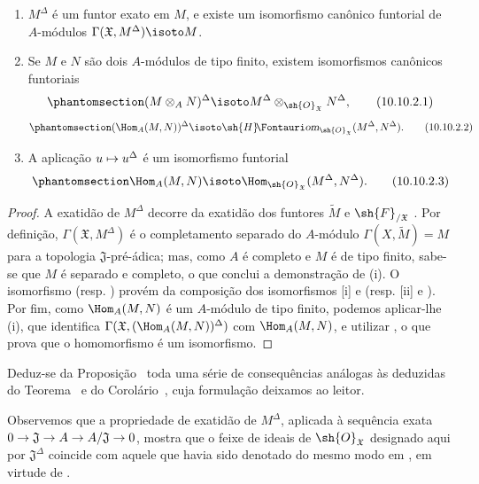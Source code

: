 \documentclass[oneside]{amsart}
\makeatletter
\newcommand{\ega@arrow}[2]{\mathchoice{#1}{#2}{#2}{#2}}
\let\ega@shortmapsto\mapsto
\renewcommand{\to}{\ega@arrow{\longrightarrow}{\rightarrow}}
\renewcommand{\mapsto}{\ega@arrow{\longmapsto}{\ega@shortmapsto}}
\newcommand*{\ega@sheafop}[3]{\sh{#1}#2\textup{\kern-2.2pt{\Fontauri\slshape #3}}}
\newcommand*{\shHom}{\ega@sheafop{H}{}{om}}
\newcommand{\oldpage}[2][]{{\marginnote{\normalfont\textbf{#1}~|~#2}}\ignorespaces}
\let\EGAOriginalLabel\label
\renewcommand{\label}[1]{\phantomsection\EGAOriginalLabel{#1}}
\makeatother
\begin{document}
\begin{proposition}[10.10.2]
\label{I.10.10.2}
\medskip\noindent
\begin{enumerate}
  \item[\rm{(i)}] $M^\Delta$ é um funtor exato em $M$, e existe um isomorfismo canônico funtorial de $A$-módulos $\Gamma(\mathfrak{X},M^\Delta)\isoto M$.
  \item[\rm{(ii)}] Se $M$ e $N$ são dois $A$-módulos de tipo finito, existem isomorfismos canônicos funtoriais
    \[
    \label{I.10.10.2.1}
      (M\otimes_A N)^\Delta\isoto M^\Delta\otimes_{\sh{O}_\mathfrak{X}}N^\Delta,
      \tag{10.10.2.1}
    \]
    \[
    \label{I.10.10.2.2}
      (\Hom_A(M,N))^\Delta\isoto\shHom_{\sh{O}_\mathfrak{X}}(M^\Delta,N^\Delta).
      \tag{10.10.2.2}
    \]
  \item[\rm{(iii)}] A aplicação $u\mapsto u^\Delta$ é um isomorfismo funtorial
    \[
    \label{I.10.10.2.3}
      \Hom_A(M,N)\isoto\Hom_{\sh{O}_\mathfrak{X}}(M^\Delta,N^\Delta).
      \tag{10.10.2.3}
    \]
\end{enumerate}
\end{proposition}

\begin{proof}
A exatidão de $M^\Delta$ decorre da exatidão dos funtores $\widetilde{M}$  e $\sh{F}_{/\mathfrak{X}}$ .
Por definição, $\Gamma(\mathfrak{X},M^\Delta)$ é o completamento separado do $A$-módulo $\Gamma(X,\widetilde{M})=M$ para a topologia $\mathfrak{J}$-pré-ádica; mas, como $A$ é completo e $M$ é de tipo finito, sabe-se  que $M$ é separado e completo, o que conclui a demonstração de (i).
O isomorfismo  (resp. ) provém da composição dos isomorfismos [i] e  (resp. [ii] e ).
Por fim, como $\Hom_A(M,N)$ é um $A$-módulo de tipo finito, podemos aplicar-lhe (i), que identifica $\Gamma(\mathfrak{X},(\Hom_A(M,N))^\Delta)$ com $\Hom_A(M,N)$, e utilizar , o que prova que o homomorfismo  é um isomorfismo.
\end{proof}

Deduz-se da Proposição~ toda uma série de consequências análogas às deduzidas do Teorema~ e do Corolário~, cuja formulação deixamos ao leitor.

\oldpage[I]{202}
Observemos que a propriedade de exatidão de $M^\Delta$, aplicada à sequência exata $0\to\mathfrak{J}\to A\to A/\mathfrak{J}\to 0$, mostra que o feixe de ideais de $\sh{O}_\mathfrak{X}$ designado aqui por $\mathfrak{J}^\Delta$ coincide com aquele que havia sido denotado do mesmo modo em , em virtude de .
\end{document}
